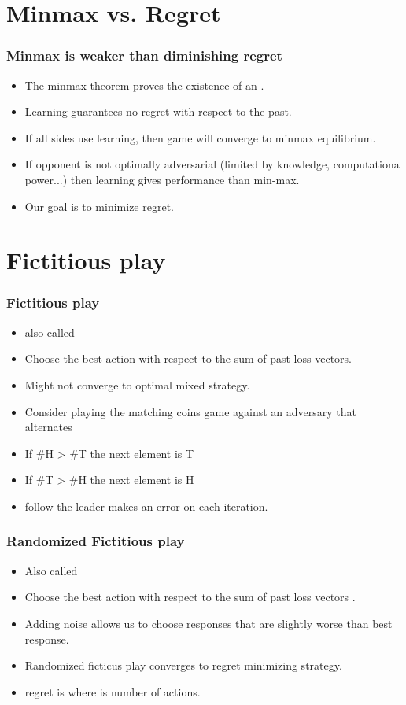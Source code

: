 \documentclass[handout]{beamer}
\begin{document}
\section{Minmax vs. Regret}

\begin{frame}
\frametitle{Minmax is weaker than diminishing regret}
\begin{itemize}
\item The minmax theorem proves the existence of an .
\item Learning guarantees no regret with respect to the past.
\item If all sides use learning, then game will converge to minmax equilibrium.
\item If opponent is not optimally adversarial (limited by knowledge, computationa power...) then learning gives  performance than min-max.
\item Our goal is to minimize regret.
\end{itemize}
\end{frame}

\section{Fictitious play}

\begin{frame}
\frametitle{Fictitious play}
\begin{itemize}
\item also called 
\item Choose the best action with respect to the sum of past loss vectors.
\item Might not converge to optimal mixed strategy.
\item Consider playing the matching coins game against an adversary
  that alternates 
\item If \#H > \#T the next element is T
\item If \#T > \#H the next element is H
\item follow the leader makes an error on each iteration.
\end{itemize}
\end{frame}

\begin{frame}
\frametitle{Randomized Fictitious play}
\begin{itemize}
\item Also called 
\item Choose the best action with respect to the sum of past loss
  vectors .
\item Adding noise allows us to choose responses that are slightly
  worse than best response.
\item {} Randomized ficticus play converges to regret
  minimizing strategy.
  \item regret is  where  is number of actions.
\end{itemize}
\end{frame}
\end{document}
